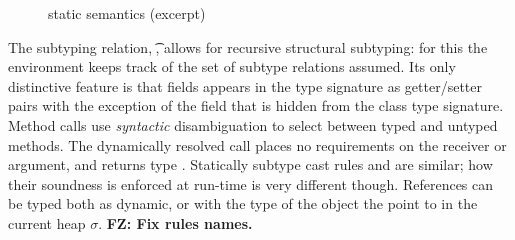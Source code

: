 \documentclass[acmlarge, anonymous, authordraft]{acmart}
\newcommand{\FZ}[1]{\textbf{FZ: #1}}
\begin{document}
\begin{figure}[!t]
\hrulefill

{\small
\begin{mathpar}









\end{mathpar}}
\hrulefill
\caption{\kafka static semantics (excerpt)}\label{f:staticsem}
\end{figure}

The
subtyping relation, \StrSub\M\K\t\tp, allows for recursive structural
subtyping: for this the environment \M keeps track of the set of subtype relations assumed.  
Its only distinctive feature is that fields
appears in the type signature as getter/setter pairs with the exception of
the \that field that is hidden from the class type signature.  Method calls use \emph{syntactic} disambiguation to select between
typed and untyped methods. The dynamically resolved call places no
requirements on the receiver or argument, and returns type \any. 
Statically subtype cast rules  and  are similar; how their soundness is enforced at run-time is very different though.  References can be typed both as dynamic, or with the type of the object the point to in the current heap \(\sigma\).   \FZ{Fix rules names.}
\end{document}
